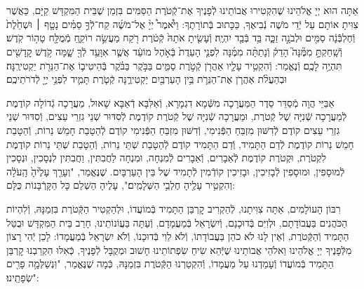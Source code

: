 \documentclass[twoside, openany, parskip=half, 11pt]{book}
\begin{document}
\newcommand{\ketoret}{
אַתָּה הוּא יְיָ אֱלֹהֵינוּ שֶׁהִקְטִירוּ אֲבוֹתֵינוּ \source{שמות ל} לְֿפָנֶיךָ אֶת־קְֿטֹרֶת הַסַּמִּים בִּזְמַן שֶׁבֵּית הַמִּקְדָּשׁ קַיָּם, כַּאֲשֶׁר צִוִּיתָ אוֹתָם עַל יְֿדֵי מֹשֶׁה נְֿבִיאֶךָ, כַּכָּתוּב בְּֿתוֹרָתֶךָ:
וַיֹּ֩אמֶר֩ יְיָ֨ אֶל־מֹשֶׁ֜ה קַח־לְֿךָ֣ סַמִּ֗ים נָטָ֤ף ׀ וּשְׁחֵ֙לֶת֙ וְֿחֶלְבְּֿֿנָ֔ה סַמִּ֖ים וּלְבֹנָ֣ה זַכָּ֑ה בַּ֥ד בְּֿבַ֖ד יִהְיֶֽה׃ וְֿעָשִׂ֤יתָ אֹתָהּ֙ קְֿטֹ֔רֶת רֹ֖קַח מַעֲשֵׂ֣ה רוֹקֵ֑חַ מְֿמֻלָּ֖ח טָה֥וֹר קֹֽדֶשׁ׃ וְֿשָֽׁחַקְתָּ֣ מִמֶּ֘נָּה֮ הָדֵק֒ וְֿנָתַתָּ֨ה מִמֶּ֜נָּה לִפְנֵ֤י הָעֵדֻת֙ בְּֿאֹ֣הֶל מוֹעֵ֔ד אֲשֶׁ֛ר אִוָּעֵ֥ד לְֿךָ֖ שָׁ֑מָּה קֹ֥דֶשׁ קׇֽדָשִׁ֖ים תִּהְיֶ֥ה לָכֶֽם׃
וְֿנֶאֱמַר: וְֿהִקְטִ֥יר עָלָ֛יו אַהֲרֹ֖ן קְֿטֹ֣רֶת סַמִּ֑ים בַּבֹּ֣קֶר בַּבֹּ֗קֶר בְּֿהֵיטִיב֛וֹ אֶת־הַנֵּרֹ֖ת יַקְטִירֶֽנָּה׃ וּבְהַעֲלֹ֨ת אַהֲרֹ֧ן אֶת־הַנֵּרֹ֛ת בֵּ֥ין הָעַרְבַּ֖יִם יַקְטִירֶ֑נָּה קְֿטֹ֧רֶת תָּמִ֛יד לִפְנֵ֥י יְיָ֖ לְֿדֹרֹתֵיכֶֽם׃


}
\\
\tamid
\\
\ketoret
אַבַּיֵּי הֲוָה מְֿסַדֵּר סֵדֶר הַמַּעֲרָכָה  מִשְּֿׁמָא דִגְמָרָא, וְֿאַלִּבָּא דְֿאַבָּא שָׁאוּל, מַעֲרָכָה גְֿדוֹלָה קוֹדֶמֶת לְֿמַעֲרָכָה שְֿׁנִיָּה שֶׁל קְֿטֹרֶת, וּמַעֲרָכָה שְֿׁנִיָּה שֶׁל קְֿטֹרֶת קוֹדֶמֶת לְֿסִדּוּר שְׁנֵי גִזְרֵי עֵצִים, וְֿסִדּוּר שְׁנֵי גִזְרֵי עֵצִים קוֹדֶם לְֿדִשּׁוּן מִזְבֵּחַ הַפְּֿנִימִי, וְֿדִשּׁוּן מִזְבֵּחַ הַפְּֿנִימִי קוֹדֶם לְֿהַטָבַת חָמֵשׁ נֵרוֹת, וְֿהַטָבַת חָמֵשׁ נֵרוֹת קוֹדֶמֶת לְֿדַם הַתָּמִיד, וְֿדַם הַתָּמִיד קוֹדֶם לְֿהַטָבַת שְׁתֵּי נֵרוֹת, וְֿהַטָבַת שְׁתֵּי נֵרוֹת קוֹדֶמֶת לִקְטֹרֶת, וּקְטֹרֶת קוֹדֶמֶת לְֿאֵבָרִים, וְֿאֵבָרִים לְֿמִנְחָה, וּמִנְחָה לַחֲבִתִּין, וַחֲבִתִּין לִנְסָכִין, וּנְסָכִין לְֿמוּסָפִין, וּמוּסָפִין לְֿבָזִיכִין, וּבָזִיכִין קוֹדְֿמִין לְֿתָמִיד שֶׁל בֵּין הָעַרְבָּיִם. שֶׁנֶּאֱמַר, "וְעָרַ֤ךְ  עָלֶ֙יהָ֙ הָֽעֹלָ֔ה וְהִקְטִ֥יר עָלֶ֖יהָ חֶלְבֵ֥י הַשְּׁלָמִֽים׃", עָלֶיהָ הַשְׁלֵם כָּל הַקָּרְֿבָּנוֹת כֻּלָּם:

רִבּוֹן הָעוֹלָמִים, אַתָּה צִוִּיתָנוּ, לְֿהַקְרִיב קׇרְבַּן הַתָּמִיד בְּֿמוֹעֲדוֹ, וּלְהַקְטִיר הַקְּֿטֹרֶת בִּזְמַנָּהּ, וְֿלִהְיוֹת הַכֹּהֲנִים בַּעֲבוֹדָתָם, וּלְוִיִּם בְּֿדוּכָנָם, וְֿיִשְׂרָאֵל בְּֿמַעֲמָדָם, וְֿעַתָּה בַּעֲוֹנוֹתֵינוּ, חָרַב בֵּית הַמִּקְדָּשׁ וּבֻטַּל הַתָּמִיד וְֿהַקְּֿטֹרֶת, וְֿאֵין לָנוּ לֹא כֹהֵן בַּעֲבוֹדָתוֹ, וְֿלֹא לֵוִי בְּֿדוּכָנוֹ, וְֿלֹא יִשְׂרָאֵל בְּֿמַעֲמָדוֹ: לָכֵן יְֿהִי רָצוֹן מִלְּֿפָנֶיךָ יְיָ אֱלֹהֵינוּ וֵאלֹהֵי אֲבוֹתֵינוּ שֶׁיְּֿהֵא שִׂיחַ שִׂפְתוֹתֵינוּ חָשׁוּב וּמְקֻבָּל לְֿפָנֶיךָ, כְּֿאִלּוּ הִקְרַבְנוּ קׇרְבַּן הַתָּמִיד בְּֿמוֹעֲדוֹ וְֿעָמַדְנוּ עַל מַעֲמָדוֹ, וְֿהִקְטַרְנוּ הַקְּֿטֹרֶת בִּזְמַנָּהּ, כְּֿמָה שֶׁנֶּאֱמַר, "וּֽנְשַׁלְּמָ֥ה  פָרִ֖ים שְׂפָתֵֽינוּ׃":
%
\end{document}
